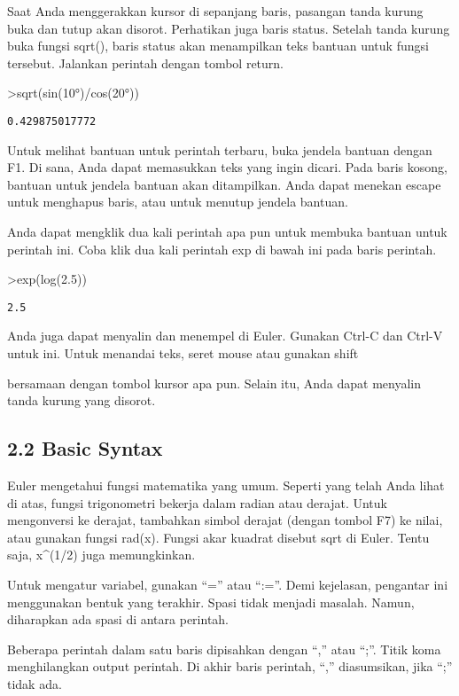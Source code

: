 \documentclass[
]{book}
\begin{document}
Saat Anda menggerakkan kursor di sepanjang baris, pasangan tanda kurung buka dan tutup akan disorot. Perhatikan juga baris status. Setelah tanda kurung buka fungsi sqrt(), baris status akan menampilkan teks bantuan untuk fungsi tersebut. Jalankan perintah dengan tombol return.

\textgreater sqrt(sin(10°)/cos(20°))

\begin{verbatim}
0.429875017772
\end{verbatim}

Untuk melihat bantuan untuk perintah terbaru, buka jendela bantuan dengan F1. Di sana, Anda dapat memasukkan teks yang ingin dicari. Pada baris kosong, bantuan untuk jendela bantuan akan ditampilkan. Anda dapat menekan escape untuk menghapus baris, atau untuk menutup jendela bantuan.

Anda dapat mengklik dua kali perintah apa pun untuk membuka bantuan untuk perintah ini. Coba klik dua kali perintah exp di bawah ini pada baris perintah.

\textgreater exp(log(2.5))

\begin{verbatim}
2.5
\end{verbatim}

Anda juga dapat menyalin dan menempel di Euler. Gunakan Ctrl-C dan Ctrl-V untuk ini. Untuk menandai teks, seret mouse atau gunakan shift

bersamaan dengan tombol kursor apa pun. Selain itu, Anda dapat menyalin tanda kurung yang disorot.

\subsection{2.2 Basic Syntax}\label{basic-syntax}

Euler mengetahui fungsi matematika yang umum. Seperti yang telah Anda lihat di atas, fungsi trigonometri bekerja dalam radian atau derajat. Untuk mengonversi ke derajat, tambahkan simbol derajat (dengan tombol F7) ke nilai, atau gunakan fungsi rad(x). Fungsi akar kuadrat disebut sqrt di Euler. Tentu saja, x\^{}(1/2) juga memungkinkan.

Untuk mengatur variabel, gunakan ``='' atau ``:=''. Demi kejelasan, pengantar ini menggunakan bentuk yang terakhir. Spasi tidak menjadi masalah. Namun, diharapkan ada spasi di antara perintah.

Beberapa perintah dalam satu baris dipisahkan dengan ``,'' atau ``;''. Titik koma menghilangkan output perintah. Di akhir baris perintah, ``,'' diasumsikan, jika ``;'' tidak ada.
\end{document}
